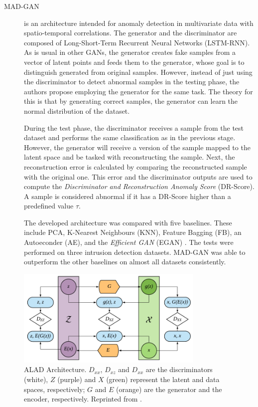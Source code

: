 \begin{description}
    \item[MAD-GAN \cite{li.etal_MADGANMultivariateAnomaly_2019}] is an architecture intended for anomaly detection in multivariate data with spatio-temporal correlations. The generator and the discriminator are composed of Long-Short-Term Recurrent Neural Networks (LSTM-RNN). As is usual in other GANs, the generator creates fake samples from a vector of latent points and feeds them to the generator, whose goal is to distinguish generated from original samples. However, instead of just using the discriminator to detect abnormal samples in the testing phase, the authors propose employing the generator for the same task. The theory for this is that by generating correct samples, the generator can learn the normal distribution of the dataset. 
    
    During the test phase, the discriminator receives a sample from the test dataset and performs the same classification as in the previous stage. However, the generator will receive a version of the sample mapped to the latent space and be tasked with reconstructing the sample. Next, the reconstruction error is calculated by comparing the reconstructed sample with the original one. This error and the discriminator outputs are used to compute the \textit{Discriminator and Reconstruction Anomaly Score} (DR-Score). A sample is considered abnormal if it has a DR-Score higher than a predefined value $\tau$. 
    
    The developed architecture was compared with five baselines. These include PCA, K-Nearest Neighbours (KNN), Feature Bagging (FB), an Autoeconder (AE), and the \textit{Efficient GAN} (EGAN) \cite{zenati.etal_EfficientGANBasedAnomaly_2018a}. The tests were performed on three intrusion detection datasets. MAD-GAN was able to outperform the other baselines on almost all datasets consistently.
\end{description}

\begin{figure}[htp]
\centering
\includegraphics[width=0.8\textwidth]{figures/alad_architecture.png}
\caption[ALAD Architecture]{ALAD Architecture. $D_{xx}$, $D_{xz}$ and $D_{xx}$ are the discriminators (white), $Z$ (purple) and $X$ (green) represent the latent and data spaces, respectively; $G$ and $E$ (orange) are the generator and the encoder, respectively. Reprinted from \cite{zenati.etal_AdversariallyLearnedAnomaly_2018}.}
\label{fig:alad_arch}
\end{figure}

